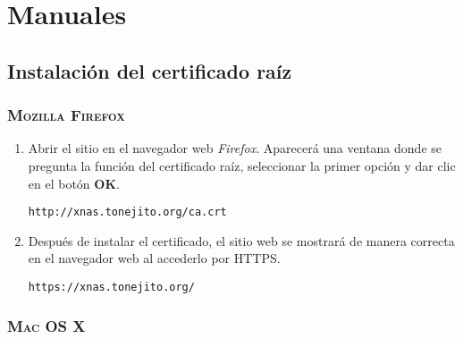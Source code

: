 {
  \linespread{1}
  \cleardoublepage  
  \appendix
  \chapter{Manuales}
  \label{apdx:a}
}

    \section {Instalaci\'{o}n del certificado ra\'{i}z}
    \label{sec:man-cert}


      \subsection {\textsc{Mozilla Firefox}}
      \label{subsec:man-cert-firefox}

{
\linespread{0.1}
\begin{enumerate}

  \item Abrir el sitio en el navegador web \textsl{Firefox}. Aparecer\'{a} una ventana donde se pregunta la funci\'{o}n del certificado ra\'{iz}, seleccionar la primer opci\'{o}n y dar clic en el bot\'{o}n \textbf{OK}.

    \texttt{http://xnas.tonejito.org/ca.crt}


  \item Despu\'{e}s de instalar el certificado, el sitio web se mostrar\'{a} de manera correcta en el navegador web al accederlo por \textsc{HTTPS}.

    \texttt{https://xnas.tonejito.org/}


\end{enumerate}
}

      \subsection {\textsc{Mac OS X}}
      \label{subsec:man-cert-macosx}


